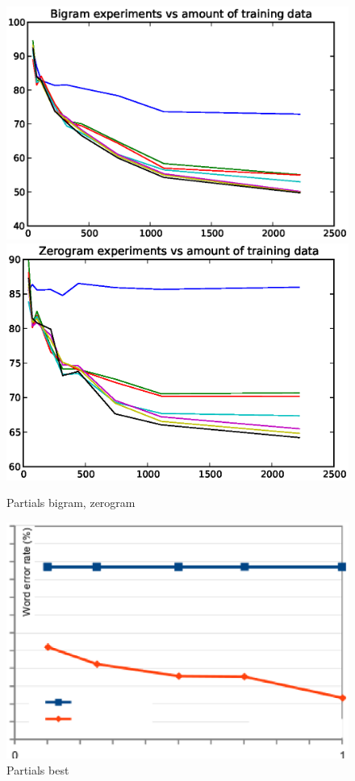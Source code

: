 \begin{figure}[!htp]
    \begin{center}
    \includegraphics{images/partial-bigram.ps}
    \includegraphics{images/partial-zerogram.ps}
    \caption{Partials bigram, zerogram}
    \label{fig:partials} 
    \end{center}
\end{figure}

\begin{figure}[!htp]
    \begin{center}
    \includegraphics{images/partial-best.ps}
    \caption{Partials best}
    \label{fig:partials_best} 
    \end{center}
\end{figure}

